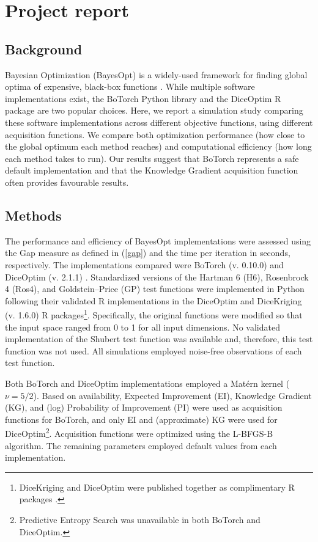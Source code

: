 

\section{Project report}
\subsection{Background}
Bayesian Optimization (BayesOpt) is a widely-used framework for finding global optima of expensive, black-box functions \cite{Jones1998, Frazier2018, Garnett2023}. While multiple software implementations exist, the BoTorch Python library \cite{Balandat2019} and the DiceOptim R package \cite{Roustant2012} are two popular choices. Here, we report a simulation study comparing these software implementations across different objective functions, using different acquisition functions. We compare both optimization performance (how close to the global optimum each method reaches) and computational efficiency (how long each method takes to run). Our results suggest that BoTorch represents a safe default implementation and that the Knowledge Gradient acquisition function often provides favourable results.

\subsection{Methods}
The performance and efficiency of BayesOpt implementations were assessed using the Gap measure as defined in (\ref{gap}) and the time per iteration in seconds, respectively. The implementations compared were BoTorch (v. 0.10.0) and DiceOptim (v. 2.1.1) \cite{Roustant2012, Balandat2019}. Standardized versions of the Hartman 6 (H6), Rosenbrock 4 (Ros4), and Goldstein–Price (GP) test functions were implemented in Python following their validated R implementations in the DiceOptim and DiceKriging (v. 1.6.0) R packages\footnote{DiceKriging and DiceOptim were published together as complimentary R packages \cite{Roustant2012}.}. Specifically, the original functions were modified so that the input space ranged from 0 to 1 for all input dimensions. No validated implementation of the Shubert test function was available and, therefore, this test function was not used. All simulations employed noise-free observations of each test function.

Both BoTorch and DiceOptim implementations employed a Matérn kernel ($\nu=5/2$). Based 
on availability, Expected Improvement (EI), Knowledge Gradient (KG), and (log) Probability of Improvement (PI) were used as acquisition functions for BoTorch, and only EI and (approximate) KG were used for DiceOptim\footnote{Predictive Entropy Search was unavailable in both BoTorch and DiceOptim.}. Acquisition functions were optimized using the L-BFGS-B algorithm. The remaining parameters employed default values from each implementation.

